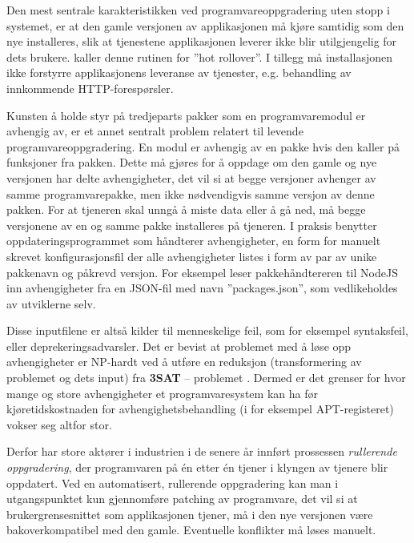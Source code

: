 Den mest sentrale karakteristikken ved programvareoppgradering uten stopp i systemet, er at den gamle versjonen av applikasjonen må kjøre samtidig som den nye installeres, slik at tjenestene applikasjonen leverer ikke blir utilgjengelig for dets brukere. \cite{choi2009} kaller denne rutinen for ''hot rollover''. I tillegg må installasjonen ikke forstyrre applikasjonens leveranse av tjenester, e.g. behandling av innkommende HTTP-forespørsler.

Kunsten å holde styr på tredjeparts pakker som en programvaremodul er avhengig av, er et annet sentralt problem relatert til levende programvareoppgradering. En modul er avhengig av en pakke hvis den kaller på funksjoner fra pakken. Dette må gjøres for å oppdage om den gamle og nye versjonen har delte avhengigheter, det vil si at begge versjoner avhenger av samme programvarepakke, men ikke nødvendigvis samme versjon av denne pakken.  For at tjeneren skal unngå å miste data eller å gå ned, må begge versjonene av en og samme pakke installeres på tjeneren. I praksis benytter oppdateringsprogrammet som håndterer avhengigheter, en form for manuelt skrevet konfigurasjonsfil der alle avhengigheter listes i form av par av unike pakkenavn og påkrevd versjon. For eksempel leser pakkehåndtereren til NodeJS inn avhengigheter fra en JSON-fil med navn ''packages.json'', som vedlikeholdes av utviklerne selv. %

Disse inputfilene er altså kilder til menneskelige feil, som for eksempel syntaksfeil, eller deprekeringsadvarsler. Det er bevist at problemet med å løse opp avhengigheter er NP-hardt ved å utføre en reduksjon (transformering av problemet og dets input) fra \textbf{3SAT} -- problemet \citep{dumitracs2009upgrades}. Dermed er det grenser for hvor mange og store avhengigheter et programvaresystem kan ha før kjøretidskostnaden for avhengighetsbehandling (i for eksempel APT-registeret) vokser seg altfor stor. %

Derfor har store aktører i industrien i de senere år innført prossessen \emph{rullerende oppgradering}, der programvaren på én etter én tjener i klyngen av tjenere blir oppdatert. Ved en automatisert, rullerende oppgradering kan man i utgangspunktet kun gjennomføre patching av programvare, det vil si at brukergrensesnittet som applikasjonen tjener, må i den nye versjonen være bakoverkompatibel med den gamle. Eventuelle konflikter må løses manuelt. %

